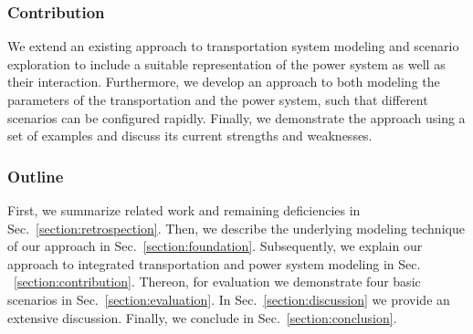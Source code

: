 \subsubsection*{Contribution}

We extend an existing approach to transportation system modeling and scenario exploration to include a suitable representation of the power system as well as their interaction. Furthermore, we develop an approach to both modeling the parameters of the transportation and the power system, such that different scenarios can be configured rapidly. Finally, we demonstrate the approach using a set of examples and discuss its current strengths and weaknesses.

\subsubsection*{Outline}

First, we summarize related work and remaining deficiencies in Sec.~\ref{section:retrospection}. Then, we describe the underlying modeling technique of our approach in Sec.~\ref{section:foundation}. Subsequently, we explain our approach to integrated transportation and power system modeling in Sec. ~\ref{section:contribution}. Thereon, for evaluation we demonstrate four basic scenarios in Sec.~\ref{section:evaluation}. In Sec.~\ref{section:discussion} we provide an extensive discussion. Finally, we conclude in Sec.~\ref{section:conclusion}.